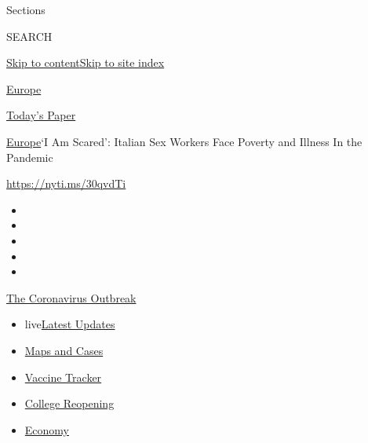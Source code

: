 Sections

SEARCH

\protect\hyperlink{site-content}{Skip to
content}\protect\hyperlink{site-index}{Skip to site index}

\href{https://www.nytimes.com/section/world/europe}{Europe}

\href{https://myaccount.nytimes.com/auth/login?response_type=cookie\&client_id=vi}{}

\href{https://www.nytimes.com/section/todayspaper}{Today's Paper}

\href{/section/world/europe}{Europe}\textbar{}`I Am Scared': Italian Sex
Workers Face Poverty and Illness In the Pandemic

\url{https://nyti.ms/30qvdTi}

\begin{itemize}
\item
\item
\item
\item
\item
\end{itemize}

\href{https://www.nytimes.com/news-event/coronavirus?action=click\&pgtype=Article\&state=default\&region=TOP_BANNER\&context=storylines_menu}{The
Coronavirus Outbreak}

\begin{itemize}
\tightlist
\item
  live\href{https://www.nytimes.com/2020/08/03/world/coronavirus-covid-19.html?action=click\&pgtype=Article\&state=default\&region=TOP_BANNER\&context=storylines_menu}{Latest
  Updates}
\item
  \href{https://www.nytimes.com/interactive/2020/us/coronavirus-us-cases.html?action=click\&pgtype=Article\&state=default\&region=TOP_BANNER\&context=storylines_menu}{Maps
  and Cases}
\item
  \href{https://www.nytimes.com/interactive/2020/science/coronavirus-vaccine-tracker.html?action=click\&pgtype=Article\&state=default\&region=TOP_BANNER\&context=storylines_menu}{Vaccine
  Tracker}
\item
  \href{https://www.nytimes.com/2020/08/02/us/covid-college-reopening.html?action=click\&pgtype=Article\&state=default\&region=TOP_BANNER\&context=storylines_menu}{College
  Reopening}
\item
  \href{https://www.nytimes.com/live/2020/08/03/business/stock-market-today-coronavirus?action=click\&pgtype=Article\&state=default\&region=TOP_BANNER\&context=storylines_menu}{Economy}
\end{itemize}

